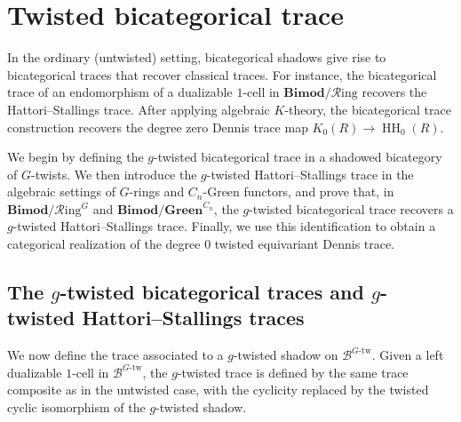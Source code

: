 \documentclass[11pt,oneside]{amsart}
\DeclareMathOperator{\HH}{HH}
\numberwithin{equation}{section}
\numberwithin{figure}{section}
\theoremstyle{plain}
\theoremstyle{definition}
\theoremstyle{remark}
\begin{document}
 

 
 

\section{Twisted bicategorical trace}
In the ordinary (untwisted) setting, bicategorical shadows give rise to bicategorical traces that recover classical traces. For instance, the bicategorical trace of an endomorphism of a dualizable $1$-cell in $\mathbf{Bimod}/\mathcal R\mathrm{ing}$ recovers the Hattori--Stallings trace. After applying algebraic $K$-theory, the bicategorical trace construction
recovers the degree zero Dennis trace map
\(
K_0(R) \to \HH_0(R).
\)

We begin by defining the \(g\)-twisted bicategorical trace in a shadowed bicategory of \(G\)-twists. We then introduce the \(g\)-twisted Hattori--Stallings trace in the algebraic settings of \(G\)-rings and \(C_n\)-Green functors, and prove that, in \(\mathbf{Bimod}/\mathcal R\mathrm{ing}^G\) and \(\mathbf{Bimod}/\mathbf{Green}^{C_n}\), the \(g\)-twisted bicategorical trace recovers a \(g\)-twisted Hattori--Stallings trace. Finally, we use this identification to obtain a categorical realization of the degree \(0\) twisted equivariant Dennis trace.

 \subsection{The $g$-twisted bicategorical traces and $g$-twisted Hattori--Stallings traces}

 We now define the trace associated to a \(g\)-twisted shadow on
\(\mathcal B^{G\text{-tw}}\). Given a left dualizable \(1\)-cell in
\(\mathcal B^{G\text{-tw}}\), the \(g\)-twisted trace is defined by the same trace composite as in the untwisted case, with the cyclicity
replaced by the twisted cyclic isomorphism of the \(g\)-twisted shadow.
\end{document}
